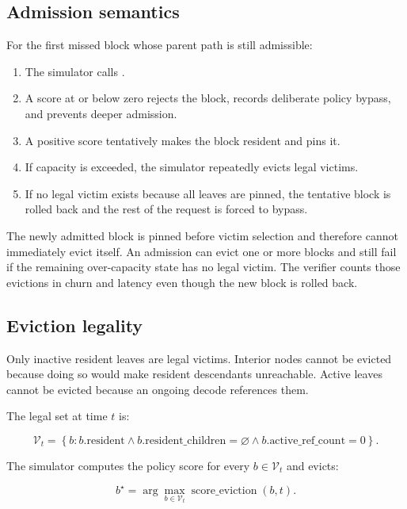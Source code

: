 \documentclass[11pt]{article}
\newcommand{\code}[1]{\texttt{\detokenize{#1}}}
\begin{document}
\subsection{Admission semantics}

For the first missed block whose parent path is still admissible:

\begin{enumerate}
  \item The simulator calls \code{score_admission}.
  \item A score at or below zero rejects the block, records deliberate policy bypass,
  and prevents deeper admission.
  \item A positive score tentatively makes the block resident and pins it.
  \item If capacity is exceeded, the simulator repeatedly evicts legal victims.
  \item If no legal victim exists because all leaves are pinned, the tentative block is
  rolled back and the rest of the request is forced to bypass.
\end{enumerate}

The newly admitted block is pinned before victim selection and therefore cannot
immediately evict itself.  An admission can evict one or more blocks and still fail if
the remaining over-capacity state has no legal victim.  The verifier counts those
evictions in churn and latency even though the new block is rolled back.

\subsection{Eviction legality}

Only inactive resident leaves are legal victims.  Interior nodes cannot be evicted
because doing so would make resident descendants unreachable.  Active leaves cannot be
evicted because an ongoing decode references them.

The legal set at time \(t\) is:

\begin{equation}
  \mathcal{V}_t =
  \left\{b:
  b.\text{resident}
  \land b.\text{resident\_children}=\varnothing
  \land b.\text{active\_ref\_count}=0
  \right\}.
\end{equation}

The simulator computes the policy score for every \(b\in\mathcal{V}_t\) and evicts:

\begin{equation}
  b^\star = \arg\max_{b\in\mathcal{V}_t}
             \operatorname{score\_eviction}(b,t).
\end{equation}
\end{document}
